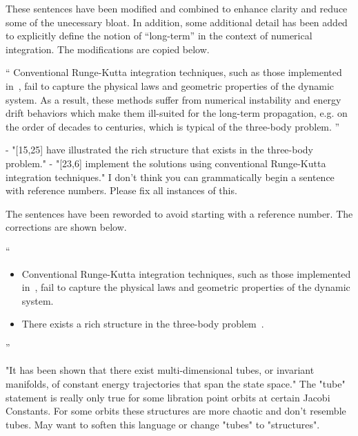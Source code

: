 \documentclass[11pt]{article}
\newenvironment{correction}{\begin{list}{}{\setlength{\leftmargin}{1cm}\setlength{\rightmargin}{1cm}}\vspace{\parsep}\item[]``}{''\end{list}}
\begin{document}
\begin{enumerate}
These sentences have been modified and combined to enhance clarity and reduce some of the unecessary bloat. 
In addition, some additional detail has been added to explicitly define the notion of ``long-term'' in the context of numerical integration.
The modifications are copied below.
\begin{correction}
    Conventional Runge-Kutta integration techniques, such as those implemented in~\cite{mingotti2011,grebow2011}, fail to capture the physical laws and geometric properties of the dynamic system.
    As a result, these methods suffer from numerical instability and energy drift behaviors which make them ill-suited for the long-term propagation, e.g. on the order of decades to centuries, which is typical of the three-body problem. 
\end{correction}

\item 
\begin{itshape}
- "[15,25] have illustrated the rich structure that exists in the three-body problem." 
- "[23,6] implement the solutions using conventional Runge-Kutta integration techniques."
I don't think you can grammatically begin a sentence with reference numbers.  Please fix all instances of this.
\end{itshape}

The sentences have been reworded to avoid starting with a reference number. 
The corrections are shown below.

\begin{correction}
    \begin{itemize}
        \item Conventional Runge-Kutta integration techniques, such as those implemented in~\cite{mingotti2011,grebow2011}, fail to capture the physical laws and geometric properties of the dynamic system.
        \item There exists a rich structure in the three-body problem~\cite{koon2011,ross2006}.
    \end{itemize}
\end{correction}

\item 
    \begin{itshape}
"It has been shown that there exist multi-dimensional tubes, or invariant manifolds, of constant energy trajectories that span the state space."  The "tube" statement is really only true for some libration point orbits at certain Jacobi Constants.  For some orbits these structures are more chaotic and don't resemble tubes.  May want to soften this language or change "tubes" to "structures".
\end{itshape}


\end{enumerate}
\end{document}
